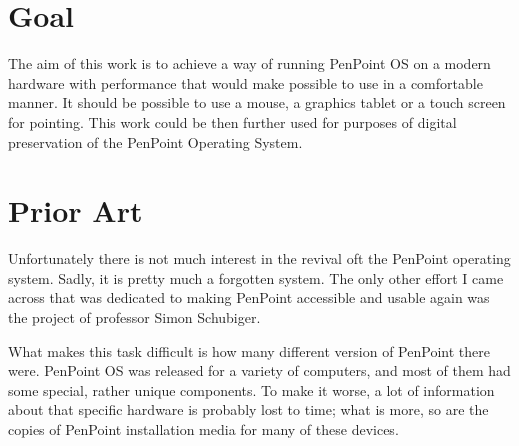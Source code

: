 \clearpage %

\section{Goal}

The aim of this work is to achieve a way of running PenPoint OS on a modern
hardware with performance that would make possible to use in a comfortable
manner.  It should be possible to use a mouse, a graphics tablet or a touch
screen for pointing.  This work could be then further used for purposes of
digital preservation of the PenPoint Operating System.


\clearpage

\section{Prior Art}



Unfortunately there is not much interest in the revival oft the PenPoint
operating system.  Sadly, it is pretty much a forgotten system.  The only other
effort I came across that was dedicated to making PenPoint accessible and
usable again was the project of professor Simon Schubiger.

What makes this task difficult is how many different version of PenPoint there
were.  PenPoint OS was released for a variety of computers, and most of them
had some special, rather unique components.  To make it worse, a lot of
information about that specific hardware is probably lost to time; what is more,
so are the copies of PenPoint installation media for many of these devices.

